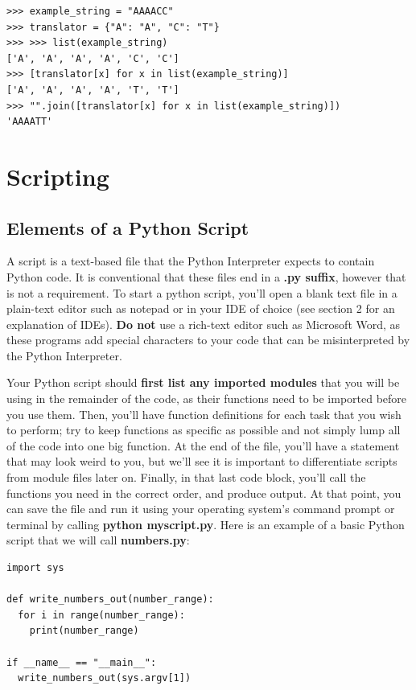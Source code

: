 \documentclass[a4paper,11pt]{article}
\begin{document}
\vspace{3mm}
\begin{lstlisting}
>>> example_string = "AAAACC"
>>> translator = {"A": "A", "C": "T"}
>>> >>> list(example_string)
['A', 'A', 'A', 'A', 'C', 'C']
>>> [translator[x] for x in list(example_string)]
['A', 'A', 'A', 'A', 'T', 'T']
>>> "".join([translator[x] for x in list(example_string)])
'AAAATT'
\end{lstlisting}
\vspace{3mm}


\pagebreak
\section{Scripting}
\subsection{Elements of a Python Script}
A script is a text-based file that the Python Interpreter expects to contain Python code.  
It is conventional that these files end in a \textbf{.py suffix}, however that is not a requirement.  
To start a python script, you'll open a blank text file in a plain-text editor such as 
notepad or in your IDE of choice (see section 2 for an explanation of IDEs).  \textbf{Do not} 
use a rich-text editor such as Microsoft Word, as these programs add special characters to your 
code that can be misinterpreted by the Python Interpreter.  \par

Your Python script should \textbf{first list any imported modules} that you will be using in the remainder 
of the code, as their functions need to be imported before you use them.  Then, you'll have function 
definitions for each task that you wish to perform; try to keep functions as specific as possible and not 
simply lump all of the code into one big function.  At the end of the file, you'll have a statement that 
may look weird to you, but we'll see it is important to differentiate scripts from module files later on.  
Finally, in that last code block, you'll call the functions you need in the correct order, and produce output.  
At that point, you can save the file and run it using your operating system's command prompt or terminal by 
calling \textbf{python myscript.py}.  Here is an example of a basic Python script that we will call 
\textbf{numbers.py}:

\vspace{3mm}
\begin{lstlisting}
import sys

def write_numbers_out(number_range):
  for i in range(number_range):
    print(number_range)

if __name__ == "__main__":
  write_numbers_out(sys.argv[1])
\end{lstlisting}
\vspace{3mm}
\end{document}
